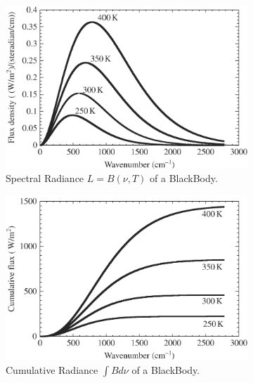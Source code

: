 \begin{figure}[H]
    \centering
    \begin{subfigure}{0.35\linewidth}
        \includegraphics[width=\linewidth]{Figures/Radiative Transfer/BB Spectral Radiance.png}
        \caption{Spectral Radiance $L=B(\nu,T)$ of a BlackBody.}
        \label{Spec Rad BB}
    \end{subfigure}
    \begin{subfigure}{0.35\linewidth}
        \includegraphics[width=\linewidth]{Figures/Radiative Transfer/BB Cumulative.png}
        \caption{Cumulative Radiance $\int B d\nu$ of a BlackBody.}
        \label{Cum BB}
    \end{subfigure}
    \begin{subfigure}{0.25\linewidth}

\end{subfigure}
\end{figure}
